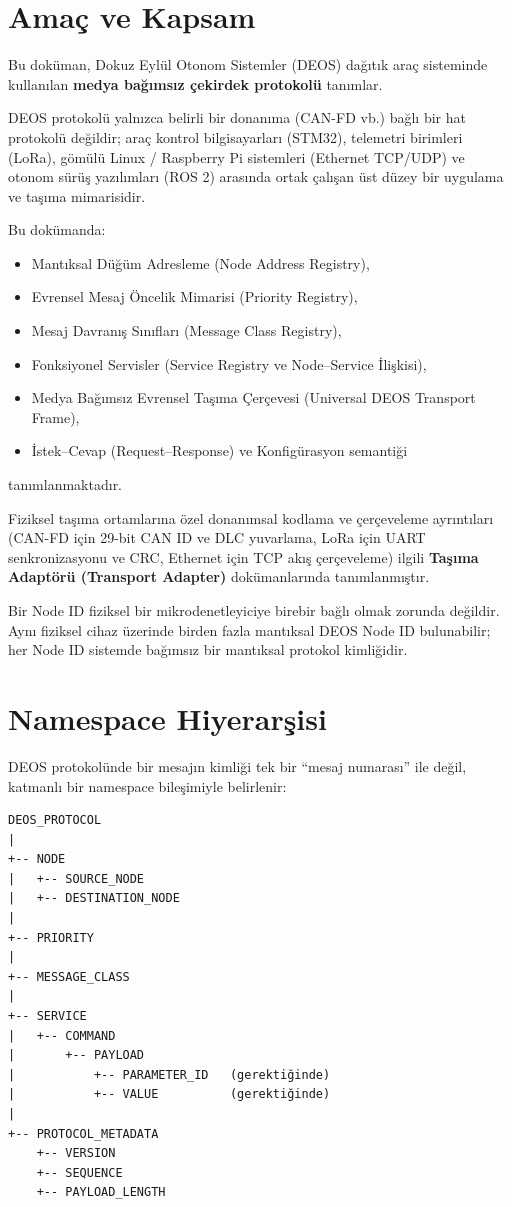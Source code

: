 \documentclass[a4paper,10pt]{article}
\begin{document}
\section{Amaç ve Kapsam}

Bu doküman, Dokuz Eylül Otonom Sistemler (DEOS) dağıtık araç sisteminde kullanılan \textbf{medya bağımsız çekirdek protokolü} tanımlar.

DEOS protokolü yalnızca belirli bir donanıma (CAN-FD vb.) bağlı bir hat protokolü değildir; araç kontrol bilgisayarları (STM32), telemetri birimleri (LoRa), gömülü Linux / Raspberry Pi sistemleri (Ethernet TCP/UDP) ve otonom sürüş yazılımları (ROS 2) arasında ortak çalışan üst düzey bir uygulama ve taşıma mimarisidir.

Bu dokümanda:
\begin{itemize}
    \item Mantıksal Düğüm Adresleme (Node Address Registry),
    \item Evrensel Mesaj Öncelik Mimarisi (Priority Registry),
    \item Mesaj Davranış Sınıfları (Message Class Registry),
    \item Fonksiyonel Servisler (Service Registry ve Node--Service İlişkisi),
    \item Medya Bağımsız Evrensel Taşıma Çerçevesi (Universal DEOS Transport Frame),
    \item İstek--Cevap (Request--Response) ve Konfigürasyon semantiği
\end{itemize}
tanımlanmaktadır.

Fiziksel taşıma ortamlarına özel donanımsal kodlama ve çerçeveleme ayrıntıları (CAN-FD için 29-bit CAN ID ve DLC yuvarlama, LoRa için UART senkronizasyonu ve CRC, Ethernet için TCP akış çerçeveleme) ilgili \textbf{Taşıma Adaptörü (Transport Adapter)} dokümanlarında tanımlanmıştır.

Bir Node ID fiziksel bir mikrodenetleyiciye birebir bağlı olmak zorunda değildir. Aynı fiziksel cihaz üzerinde birden fazla mantıksal DEOS Node ID bulunabilir; her Node ID sistemde bağımsız bir mantıksal protokol kimliğidir.

\section{Namespace Hiyerarşisi}

DEOS protokolünde bir mesajın kimliği tek bir ``mesaj numarası'' ile değil, katmanlı bir namespace bileşimiyle belirlenir:

\begin{verbatim}
DEOS_PROTOCOL
|
+-- NODE
|   +-- SOURCE_NODE
|   +-- DESTINATION_NODE
|
+-- PRIORITY
|
+-- MESSAGE_CLASS
|
+-- SERVICE
|   +-- COMMAND
|       +-- PAYLOAD
|           +-- PARAMETER_ID   (gerektiğinde)
|           +-- VALUE          (gerektiğinde)
|
+-- PROTOCOL_METADATA
    +-- VERSION
    +-- SEQUENCE
    +-- PAYLOAD_LENGTH
\end{verbatim}
\end{document}
